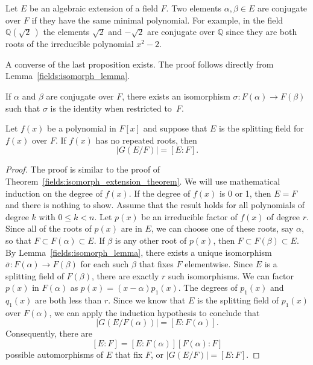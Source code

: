 \medskip
 
Let $E$ be an algebraic extension of a field $F$.  Two elements $\alpha, \beta \in E$ are {\bfi conjugate\/} over $F$ if they have the same minimal polynomial. For example, in the field ${\mathbb Q}( \sqrt{2}\, )$ the elements $\sqrt{2}$ and $-\sqrt{2}$ are conjugate over ${\mathbb Q}$ since they are both roots of the irreducible polynomial $x^2 - 2$.  
 
A converse of the last proposition exists. The proof follows directly from Lemma~\ref{fields:isomorph_lemma}. 

\begin{proposition}
If $\alpha$ and $\beta$ are conjugate over $F$, there exists an isomorphism $\sigma : F( \alpha ) \rightarrow F( \beta )$ such that $\sigma$ is the identity when restricted to~$F$.
\end{proposition}

\begin{theorem}\label{galois:extension_order_theorem}
Let $f(x)$ be a polynomial in $F[x]$ and suppose that $E$ is the splitting field for $f(x)$ over $F$.  If $f(x)$ has no repeated roots, then 
\[
|G(E/F)| = [E:F].
\]
\end{theorem}
 
\begin{proof}
The proof is similar to the proof of Theorem~\ref{fields:isomorph_extension_theorem}.  We will use mathematical induction on the degree of $f(x)$.  If the degree of $f(x)$ is 0 or 1, then $E = F$ and there is nothing to show.  Assume
that the result holds for all polynomials of degree $k$ with $0 \leq k < n$.  Let $p(x)$ be an irreducible factor of $f(x)$ of degree $r$.  Since all of the roots of $p(x)$ are in $E$, we can choose one of
these roots, say $\alpha$, so that $F \subset F( \alpha ) \subset E$.  If $\beta$ is any other root of $p(x)$, then $F \subset F( \beta ) \subset E$.  By Lemma~\ref{fields:isomorph_lemma}, there exists a unique isomorphism $\overline{\sigma}: F( \alpha ) \rightarrow F( \beta )$ for each such $\beta$ that fixes $F$ elementwise.  Since $E$ is a splitting field of $F(\beta)$, there are exactly $r$ such isomorphisms.  We can factor
$p(x)$ in $F(\alpha)$ as $p(x) = (x - \alpha) p_1(x)$.  The degrees of $p_1(x)$ and $q_1(x)$ are both less than $r$.  Since we know that $E$ is the  splitting field of $p_1(x)$ over $F(\alpha)$, we can apply
the induction  hypothesis to conclude that 
\[
|G(E/F(\alpha))| = [E:F(\alpha)].
\]
Consequently, there are
\[
[E:F] = [E:F(\alpha)] [F( \alpha):F]
\]
possible automorphisms of $E$ that fix $F$, or $|G(E/F)| = [E:F]$.
\end{proof}
 
